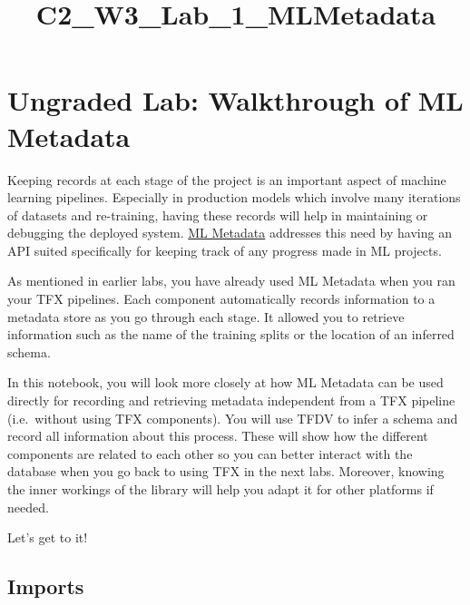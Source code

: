 \documentclass[11pt]{article}
\title{C2\_W3\_Lab\_1\_MLMetadata}
\begin{document}
    
    \maketitle
    
    

    
    \hypertarget{ungraded-lab-walkthrough-of-ml-metadata}{%
\section{Ungraded Lab: Walkthrough of ML
Metadata}\label{ungraded-lab-walkthrough-of-ml-metadata}}

Keeping records at each stage of the project is an important aspect of
machine learning pipelines. Especially in production models which
involve many iterations of datasets and re-training, having these
records will help in maintaining or debugging the deployed system.
\href{https://www.tensorflow.org/tfx/guide/mlmd}{ML Metadata} addresses
this need by having an API suited specifically for keeping track of any
progress made in ML projects.

As mentioned in earlier labs, you have already used ML Metadata when you
ran your TFX pipelines. Each component automatically records information
to a metadata store as you go through each stage. It allowed you to
retrieve information such as the name of the training splits or the
location of an inferred schema.

In this notebook, you will look more closely at how ML Metadata can be
used directly for recording and retrieving metadata independent from a
TFX pipeline (i.e.~without using TFX components). You will use TFDV to
infer a schema and record all information about this process. These will
show how the different components are related to each other so you can
better interact with the database when you go back to using TFX in the
next labs. Moreover, knowing the inner workings of the library will help
you adapt it for other platforms if needed.

Let's get to it!

    \hypertarget{imports}{%
\subsection{Imports}\label{imports}}
\end{document}
